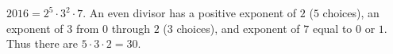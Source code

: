 $2016=2^5\cdot3^2\cdot7$. An even divisor has a positive exponent of $2$ ($5$ choices), an exponent of $3$ from $0$ through $2$ ($3$ choices), and exponent of $7$ equal to $0$ or $1$. Thus there are $5\cdot3\cdot2=\boxed{30}$.
